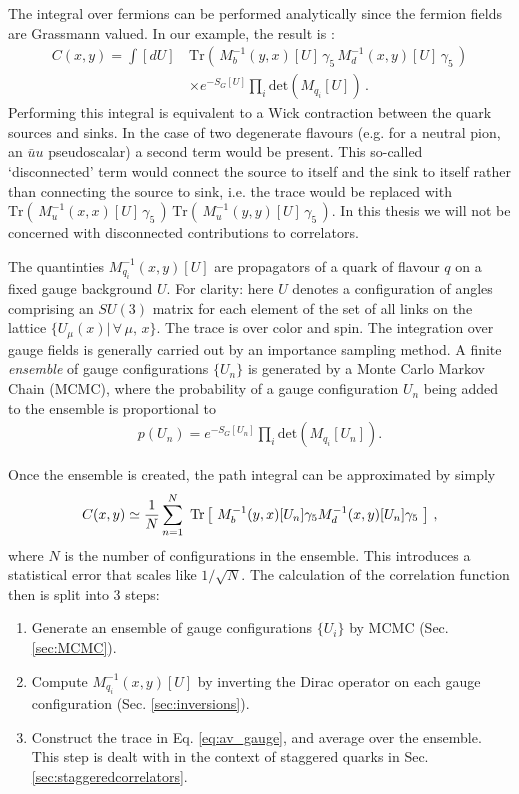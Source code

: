 The integral over fermions can be performed analytically since the fermion fields are Grassmann valued. In our example, the result is \cite{Peskin:1995ev}:
\begin{align}
  \nonumber
  C(x,y) = \int [dU]\, &\text{Tr}\left( \, M^{-1}_b(y,x)[U] \, \gamma_5 \, M^{-1}_d(x,y)[U] \, \gamma_5 \, \right) \\ &\times e^{-S_G[U]} \prod_i\text{det}(M_{q_i}[U])\,.
  \label{eq:lattice_correlator}
\end{align}
Performing this integral is equivalent to a Wick contraction between the quark sources and sinks. In the case of two degenerate flavours (e.g. for a neutral pion, an $\bar{u}u$ pseudoscalar) a second term would be present. This so-called `disconnected' term would connect the source to itself and the sink to itself rather than connecting the source to sink, i.e. the trace would be replaced with $\text{Tr}( \, M^{-1}_u(x,x)[U] \, \gamma_5 \,)\,\text{Tr}(\,M^{-1}_u(y,y)[U] \, \gamma_5 \,)$. In this thesis we will not be concerned with disconnected contributions to correlators.

The quantinties $M_{q_i}^{-1}(x,y)[U]$ are propagators of a quark of flavour $q$ on a fixed gauge background $U$. For clarity: here $U$ denotes a configuration of angles comprising an $SU(3)$ matrix for each element of the set of all links on the lattice $\{ U_{\mu}(x) | \,\forall \,\mu,\,x \}$. The trace is over color and spin. The integration over gauge fields is generally carried out by an importance sampling method. A finite \textit{ensemble} of gauge configurations $\{U_n\}$ is generated by a Monte Carlo Markov Chain (MCMC), where the probability of a gauge configuration $U_n$ being added to the ensemble is proportional to
\begin{align}
  p(U_n) = e^{-S_G[U_n]}\prod_i\text{det}(M_{q_i}[U_n]).
  \label{eq:MCweight}
\end{align}

Once the ensemble is created, the path integral can be approximated by simply
\begin{align}
  C(x,y) \simeq {1\over N} \sum^N_{n=1} \text{ Tr}\left[\text{ } M^{-1}_b(y,x)[U_n] \gamma_5 M^{-1}_d(x,y)[U_n] \gamma_5 \text{ }\right]\,,
  \label{eq:av_gauge}
\end{align}
where $N$ is the number of configurations in the ensemble. This introduces a statistical error that scales like $1/\sqrt{N}$. The calculation of the correlation function then is split into 3 steps:
\begin{enumerate}
\item
  Generate an ensemble of gauge configurations $\{ U_i \}$ by MCMC (Sec. \ref{sec:MCMC}).
\item
  Compute $M^{-1}_{q_i}(x,y)[U]$ by inverting the Dirac operator on each gauge configuration (Sec. \ref{sec:inversions}).
\item
  Construct the trace in Eq. \eqref{eq:av_gauge}, and average over the ensemble. This step is dealt with in the context of staggered quarks in Sec. \ref{sec:staggeredcorrelators}.
\end{enumerate}


